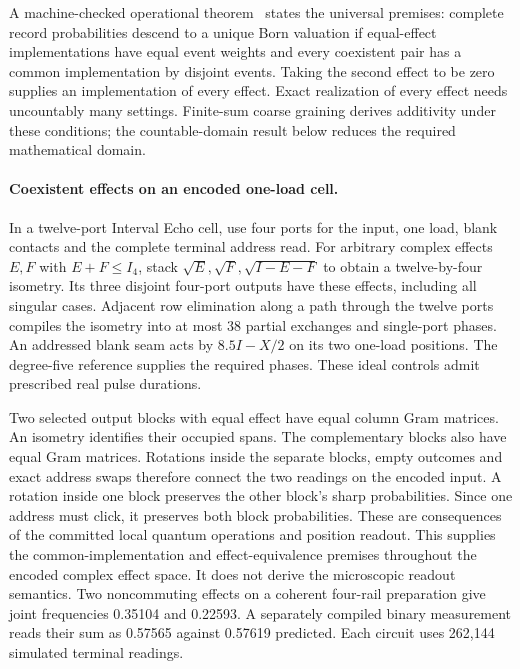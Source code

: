 \documentclass[11pt]{article}
\begin{document}
A machine-checked operational theorem~\cite{ophrepo} states the universal
premises:
complete record probabilities descend to a unique Born valuation if
equal-effect implementations have equal event weights and every coexistent
pair has a common implementation by disjoint events. Taking the second
effect to be zero supplies an implementation of every effect. Exact realization
of every effect needs uncountably many settings. Finite-sum coarse graining
derives additivity under these conditions; the countable-domain result below
reduces the required mathematical domain.

\paragraph{Coexistent effects on an encoded one-load cell.}
In a twelve-port Interval Echo cell, use four ports for the input,
one load, blank contacts and the complete terminal address read.
For arbitrary complex effects \(E,F\) with \(E+F\le I_4\), stack
\(\sqrt E,\sqrt F,\sqrt{I-E-F}\) to obtain a twelve-by-four isometry.
Its three disjoint four-port outputs have these effects, including
all singular cases. Adjacent row elimination along a path through the
twelve ports compiles the isometry into at most 38 partial
exchanges and single-port phases. An addressed blank seam acts by
\(8.5I-X/2\) on its two one-load positions. The degree-five reference
supplies the required phases. These ideal controls admit prescribed
real pulse durations.

Two selected output blocks with equal effect have equal column Gram
matrices. An isometry identifies their occupied spans. The
complementary blocks also have equal Gram matrices. Rotations inside
the separate blocks, empty outcomes and exact address swaps therefore
connect the two readings on the encoded input. A rotation inside
one block preserves the other block's sharp probabilities. Since
one address must click, it preserves both block probabilities.
These are consequences of the committed local quantum operations
and position readout. This supplies the common-implementation and
effect-equivalence premises throughout the encoded complex effect
space. It does not derive the microscopic readout semantics.
Two noncommuting effects on a coherent four-rail preparation
give joint frequencies 0.35104 and 0.22593. A separately compiled
binary measurement reads their sum as 0.57565 against 0.57619
predicted. Each circuit uses 262,144 simulated terminal readings.
\end{document}
